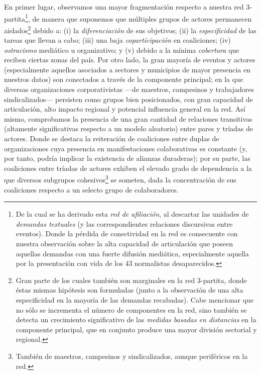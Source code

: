 \documentclass[letterpaper, 11pt]{book}
\theoremstyle{definition}
\theoremstyle{remark}
\begin{document}
En primer lugar, observamos una mayor fragmentación respecto a nuestra red 3-partita\footnote{
    De la cual se ha derivado esta \emph{red de afiliación}, al descartar las unidades de \emph{demandas textuales} (y las correspondientes relaciones discursivas entre eventos). 
    Donde la pérdida de conectividad en la red es consecuente con nuestra observación sobre la alta capacidad de articulación que poseen aquellas demandas con una fuerte difusión mediática, especialmente aquella por la presentación con vida de los 43 normalistas desaparecidos. 
}, de manera que suponemos que múltiples grupos de actores permanecen aislados\footnote{
    Gran parte de los cuales también son marginales en la red 3-partita, donde éstas mismas hipótesis son formuladas (junto a la observación de una alta especificidad en la mayoría de las demandas recabadas). 
    Cabe mencionar que no sólo se incrementa el número de componentes en la red, sino también se detecta un crecimiento significativo de las \emph{medidas basadas en distancias} en la componente principal, que en conjunto produce una mayor división sectorial y regional. 
} debido a: 
(i) la \emph{diferenciación} de sus objetivos; 
(ii) la \emph{especificidad} de las tareas que llevan a cabo; 
(iii) una baja \emph{coparticipación} en coaliciones; 
(iv) \emph{ostracismo} mediático u organizativo; 
y (v) debido a la mínima \emph{cobertura} que reciben ciertas zonas del país. 
Por otro lado, la gran mayoría de eventos y actores (especialmente aquellos asociados a sectores y municipios de mayor presencia en nuestros datos) son conectados a través de la componente principal; en la que diversas organizaciones corporativistas ---de maestros, campesinos y trabajadores sindicalizados--- persisten como grupos bien posicionados, con gran capacidad de articulación, alto impacto regional y potencial influencia general en la red. 
Así mismo, comprobamos la presencia de una gran cantidad de relaciones transitivas (altamente significativas respecto a un modelo aleatorio) entre pares y tríadas de actores. 
Donde se destaca la reiteración de coaliciones entre duplas de organizaciones cuya presencia en manifestaciones colaborativas es constante (y, por tanto, podría implicar la existencia de alianzas duraderas); por su parte, las coaliciones entre tríadas de actores exhiben el elevado grado de dependencia a la que diversos subgrupos cohesivos\footnote{
    También de maestros, campesinos y sindicalizados, aunque periféricos en la red. 
} 
se someten, dada la concentración de sus coaliciones respecto a un selecto grupo de colaboradores. 
\end{document}
